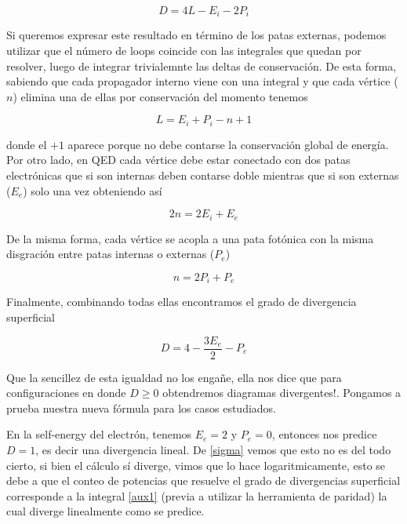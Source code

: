 \documentclass{article}
\numberwithin{equation}{section}
\begin{document}
\begin{equation}\label{key}
D=4L-E_i-2P_i
\end{equation}

Si queremos expresar este resultado en término de los patas externas, podemos utilizar que el número de loops coincide con las integrales que quedan por resolver, luego de integrar trivialemnte las deltas de conservación. De esta forma, sabiendo que cada propagador interno viene con una integral y que cada vértice ($ n $) elimina una de ellas por conservación del momento tenemos 

\begin{equation}\label{key}
L=E_i+P_i-n+1
\end{equation}

donde el $ +1 $ aparece porque no debe contarse la conservación global de energía. Por otro lado, en QED cada vértice debe estar conectado con dos patas electrónicas que si son internas deben contarse doble mientras que si son externas ($ E_e $) solo una vez obteniendo así

\begin{equation}\label{key}
2n=2E_i + E_e
\end{equation}

De la misma forma, cada vértice se acopla a una pata fotónica con la misma disgración entre patas internas o externas ($ P_e $)

\begin{equation}\label{key}
n=2P_i + P_e
\end{equation}

Finalmente, combinando todas ellas encontramos el grado de divergencia superficial

\begin{equation}\label{D}
D=4-\frac{3E_e}{2}-P_e
\end{equation}

Que la sencillez de esta igualdad no los engañe, ella nos dice que para configuraciones en donde $ D\geq0 $ obtendremos diagramas divergentes!. Pongamos a prueba nuestra nueva fórmula para los casos estudiados. 

En la self-energy del electrón, tenemos $ E_e=2 $ y $ P_e=0 $, entonces nos predice $ D=1 $, es decir una divergencia lineal. De \ref{sigma} vemos que esto no es del todo cierto, si bien el cálculo sí diverge, vimos que lo hace logaritmicamente, esto se debe a que el conteo de potencias que resuelve el grado de divergencias superficial corresponde a la integral \ref{aux1} (previa a utilizar la herramienta de paridad) la cual diverge linealmente como se predice. 
\end{document}
